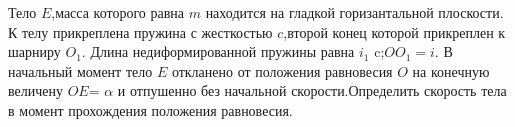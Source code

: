 Тело $E$,масса которого равна $m$ находится на гладкой горизантальной плоскости. К телу прикреплена пружина с жесткостью $c$,второй конец которой прикреплен к шарниру $O_{1}$.
Длина недиформированной пружины равна $i_1$ c;$OO_{1}=i$. В начальный момент тело $E$ откланено от положения равновесия $O$ на конечную величену $OE$= $\alpha$ и отпушенно без
начальной скорости.Определить скорость тела в момент прохождения положения равновесия.